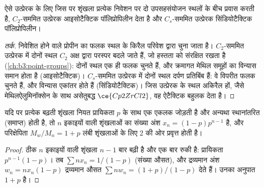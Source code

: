 \begin{proposition}[उत्प्रेरक सममिति से टैक्टिसिटी]\label{prop:b3:homogeneous-catalysis:tacticity-symmetry}
ऐसे  उत्प्रेरक के लिए जिस पर शृंखला प्रत्येक निवेशन पर दो उपसहसंयोजन
स्थलों के बीच प्रवास करती है, $C_2$-सममित उत्प्रेरक आइसोटैक्टिक
पॉलिप्रोपिलीन देता है और $C_s$-सममित उत्प्रेरक सिंडियोटैक्टिक पॉलिप्रोपिलीन।
\end{proposition}

\begin{proof}[तर्क]
निवेशित होने वाले प्रोपीन का फलक स्थल के किरैल परिवेश द्वारा चुना जाता है।
$C_2$-सममित उत्प्रेरक में दोनों स्थल $C_2$ अक्ष द्वारा परस्पर बदले जाते हैं,
जो हस्तता को संरक्षित रखता है (\cref{ch:b3:point-groups}): दोनों स्थल
एक ही फलक चुनते हैं, और क्रमागत मेथिल समूहों का विन्यास समान होता है (आइसोटैक्टिक)।
$C_s$-सममित उत्प्रेरक में दोनों स्थल दर्पण प्रतिबिंब हैं: वे विपरीत
फलक चुनते हैं, और विन्यास एकांतर होते हैं (सिंडियोटैक्टिक)। जिस उत्प्रेरक के स्थल
अकिरैल हों, जैसे मेथिलऐलुमिनॉक्सेन के साथ असेतुबद्ध $\ce{Cp2ZrCl2}$, वह ऐटैक्टिक
बहुलक देता है।
\end{proof}

\begin{proposition}[शुल्ज़--फ़्लोरी वितरण]\label{prop:b3:homogeneous-catalysis:schulz-flory}
यदि  पर प्रत्येक बढ़ती शृंखला नियत
प्रायिकता $p$ के साथ एक एकलक जोड़ती है और अन्यथा स्थानांतरित (समाप्त) होती है, तो
$n$ इकाइयों वाली शृंखलाओं का संख्या अंश $x_n = (1 - p)p^{n-1}$ है, और परिक्षेपिता $M_w/M_n = 1 + p$ लंबी शृंखलाओं के लिए 2 की ओर प्रवृत्त होती है।
\end{proposition}

\begin{proof}
ठीक $n$ इकाइयों वाली शृंखला $n - 1$ बार बढ़ी है और एक बार रुकी है:
प्रायिकता $p^{n-1}(1 - p)$। तब $\sum nx_n = 1/(1 - p)$ (संख्या औसत), और द्रव्यमान
अंश $w_n = nx_n(1 - p)$ द्रव्यमान औसत $\sum nw_n = (1 + p)/(1 - p)$ देते हैं। उनका
अनुपात $1 + p$ है।
\end{proof}

